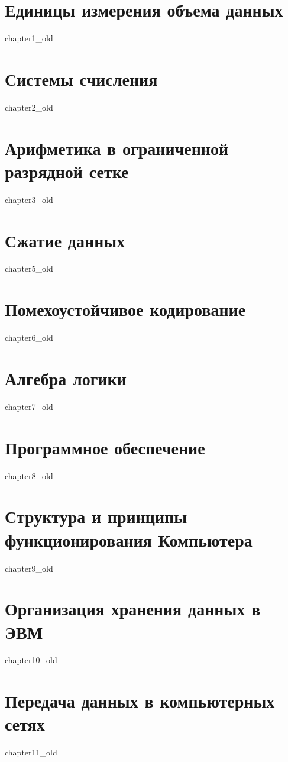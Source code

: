 \documentclass[a5paper,14pt]{report}
\begin{document}
\chapter{Единицы измерения объема данных}
 {chapter1_old}

\chapter{Системы счисления}
 {chapter2_old}

\chapter{Арифметика в ограниченной разрядной сетке}
 {chapter3_old}


\chapter{Сжатие данных}
 {chapter5_old}

\chapter{Помехоустойчивое кодирование}
 {chapter6_old}

\chapter{Алгебра логики}
 {chapter7_old}

\chapter{Программное обеспечение}
 {chapter8_old}

\chapter{Структура и принципы функционирования Компьютера}
 {chapter9_old}

\chapter{Организация хранения данных в ЭВМ}
 {chapter10_old}

\chapter{Передача данных в компьютерных сетях}
 {chapter11_old}
\end{document}
